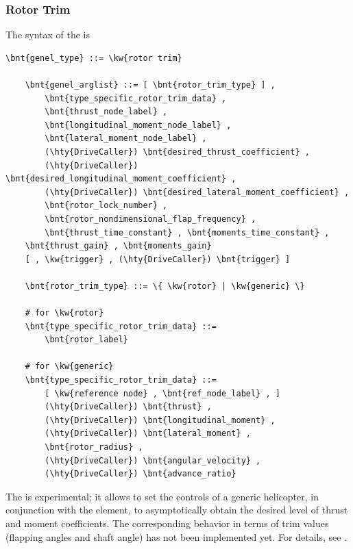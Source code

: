 \subsubsection{Rotor Trim}
\label{sec:EL:GENEL:ROTOR-TRIM}
The syntax of the  is
\begin{Verbatim}[commandchars=\\\{\}]
    \bnt{genel_type} ::= \kw{rotor trim}

    \bnt{genel_arglist} ::= [ \bnt{rotor_trim_type} ] ,
        \bnt{type_specific_rotor_trim_data} ,
        \bnt{thrust_node_label} ,
        \bnt{longitudinal_moment_node_label} ,
        \bnt{lateral_moment_node_label} ,
        (\hty{DriveCaller}) \bnt{desired_thrust_coefficient} ,
        (\hty{DriveCaller}) \bnt{desired_longitudinal_moment_coefficient} ,
        (\hty{DriveCaller}) \bnt{desired_lateral_moment_coefficient} ,
        \bnt{rotor_lock_number} ,
        \bnt{rotor_nondimensional_flap_frequency} ,
        \bnt{thrust_time_constant} , \bnt{moments_time_constant} ,
	\bnt{thrust_gain} , \bnt{moments_gain}
	[ , \kw{trigger} , (\hty{DriveCaller}) \bnt{trigger} ]

    \bnt{rotor_trim_type} ::= \{ \kw{rotor} | \kw{generic} \}

    # for \kw{rotor}
    \bnt{type_specific_rotor_trim_data} ::=
        \bnt{rotor_label}

    # for \kw{generic}
    \bnt{type_specific_rotor_trim_data} ::=
        [ \kw{reference node} , \bnt{ref_node_label} , ]
        (\hty{DriveCaller}) \bnt{thrust} ,
        (\hty{DriveCaller}) \bnt{longitudinal_moment} ,
        (\hty{DriveCaller}) \bnt{lateral_moment} ,
        \bnt{rotor_radius} ,
        (\hty{DriveCaller}) \bnt{angular_velocity} ,
        (\hty{DriveCaller}) \bnt{advance_ratio}
\end{Verbatim}
The  is experimental; it allows to set the controls 
of a generic helicopter, in conjunction with the 
element, to asymptotically obtain the desired level of thrust and
moment coefficients.
The corresponding behavior in terms of trim values (flapping angles
and shaft angle) has not been implemented yet.
For details, see \cite{PETERS-TRIM90}.







